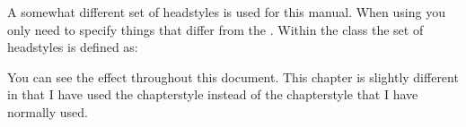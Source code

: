     A somewhat different set of headstyles is used for this manual. When using
\cmd{\makeheadstyles} you only need to specify things that differ from
the . Within the class the  set of headstyles 
is defined as:
\begin{lcode}
\newcommand*{\addperiod}[1]{#1.}
\end{lcode}
    You can see the effect throughout this document. This chapter is
slightly different in that I have used the  chapterstyle
instead of the  chapterstyle that I have normally used.
    
